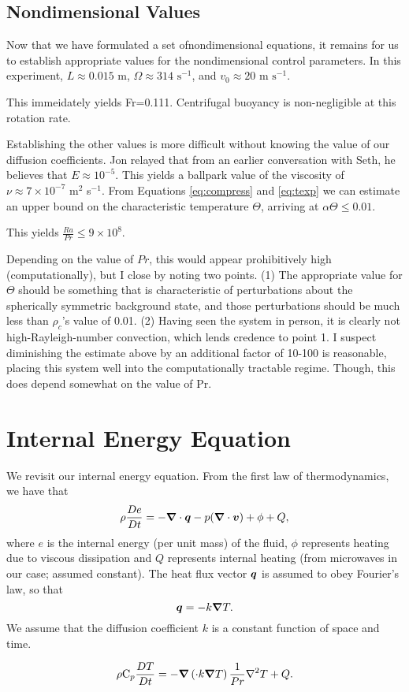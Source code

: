 \subsection{Nondimensional Values}
Now that we have formulated a set ofnondimensional equations, it remains for us to establish appropriate values for the nondimensional control parameters.
In this experiment, $L \approx 0.015$ m, $\Omega \approx 314 \,\,\mathrm{ s}^{-1}$, and $v_0 \approx 20 \,\,\mathrm{m}\,\,\mathrm{s}^{-1}$.  

This immeidately yields Fr=0.111.  Centrifugal buoyancy is non-negligible at this rotation rate.

Establishing the other values is more difficult without knowing the value of our diffusion coefficients.  Jon relayed that from an earlier conversation with Seth, he believes that $E\approx 10^{-5}$.   This yields a ballpark value of the viscosity of $\nu\approx 7\times 10^{-7}$ m$^2$ s$^{-1}$.  From Equations \ref{eq:compress} and \ref{eq:texp} we can estimate an upper bound on the characteristic temperature $\Theta$, arriving at $\alpha\Theta\leq 0.01$.   

This yields $\frac{Ra}{Pr}\leq 9\times 10^{8}$.   

Depending on the value of $Pr$, this would appear prohibitively high (computationally), but I close by noting two points.  (1)  The appropriate value for $\Theta$ should be something that is characteristic of perturbations about the spherically symmetric background state, and those perturbations should be much less than $\rho_c$'s value of 0.01.  (2)  Having seen the system in person, it is clearly not high-Rayleigh-number convection, which lends credence to point 1.   I suspect diminishing the estimate above by an additional factor of 10-100 is reasonable, placing this system well into the computationally tractable regime.  Though, this does depend somewhat on the value of Pr.
 

\clearpage


\section{Internal Energy Equation}
We revisit our internal energy equation.  From the first law of thermodynamics, we have that 
\begin{equation}
\rho \frac{De}{Dt} = -\boldsymbol{\nabla}\cdot\boldsymbol{q} - p(\boldsymbol{\nabla}\cdot\boldsymbol{v}) + \phi + Q ,
\end{equation}
where $e$ is the internal energy (per unit mass) of the fluid, $\phi$ represents heating due to viscous dissipation and $Q$ represents internal heating (from microwaves in our case; assumed constant).  The heat flux vector $\boldsymbol{q}$ is assumed to obey Fourier's law, so that
\begin{equation}
\boldsymbol{q} = -k\boldsymbol{\nabla} T.
\end{equation}
We assume that the diffusion coefficient $k$ is a constant function of space and time.

\begin{equation}
\rho\mathrm{C}_p\frac{DT}{Dt}=-\boldsymbol{\nabla}\left( \cdot{k\boldsymbol{\nabla}T} \right) \frac{1}{Pr}\nabla^2T + Q.
\end{equation}
